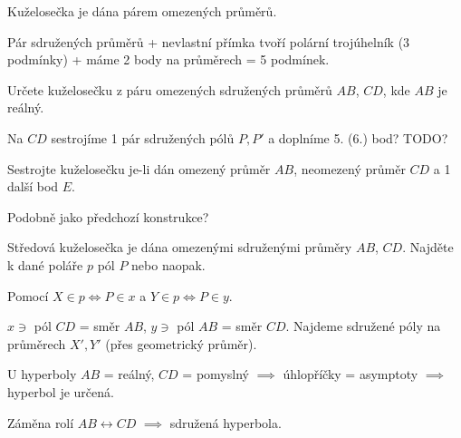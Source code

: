 \documentclass[12pt]{article}					%
\begin{document}
\begin{veta}
	Kuželosečka je dána párem omezených průměrů.

	\begin{dukazin}
		Pár sdružených průměrů + nevlastní přímka tvoří polární trojúhelník (3 podmínky) + máme 2 body na průměrech = 5 podmínek.
	\end{dukazin}
\end{veta}

\begin{priklad}[Konstrukce]
	Určete kuželosečku z páru omezených sdružených průměrů $AB$, $CD$, kde $AB$ je reálný.

	\begin{reseni}
		Na $CD$ sestrojíme 1 pár sdružených pólů $P, P'$ a doplníme 5. (6.) bod? TODO?
	\end{reseni}
\end{priklad}

\begin{priklad}[Konstrukce]
	Sestrojte kuželosečku je-li dán omezený průměr $AB$, neomezený průměr $CD$ a 1 další bod $E$.

	\begin{reseni}
		Podobně jako předchozí konstrukce?
	\end{reseni}
\end{priklad}

\begin{priklad}[Konstrukce]
	Středová kuželosečka je dána omezenými sdruženými průměry $AB$, $CD$. Najděte k dané poláře $p$ pól $P$ nebo naopak.

	\begin{reseni}
		Pomocí $X \in p \Leftrightarrow P \in x$ a $Y \in p \Leftrightarrow P \in y$.

		$x \ni$ pól $CD$ = směr $AB$, $y \ni$ pól $AB$ = směr $CD$. Najdeme sdružené póly na průměrech $X', Y'$ (přes geometrický průměr).
	\end{reseni}
\end{priklad}

\begin{poznamka}
	U hyperboly $AB$ = reálný, $CD$ = pomyslný $\implies$ úhlopříčky = asymptoty $\implies$ hyperbol je určená.

	Záměna rolí $AB \leftrightarrow CD$ $\implies$ sdružená hyperbola.
\end{poznamka}
\end{document}
